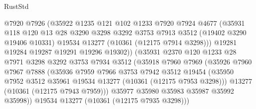 \begin{lexlean}{RustStd}
\begin{coremodule}
                        @7920
                        @7926
                        (@35922
                          @1235
                          @121
                          @102
                          @1233
                          @7920
                          @7924
                          @4677
                          (@35931
                            @118
                            @120
                            @13
                            @28
                            @3290
                            @3298
                            @3292
                            @3753
                            @7913
                            @3512
                            (@19402 @3290 @19406 @10331)
                            @19534
                            @13277
                            (@10361 (@12175 @7914 @3298)))
                          @19281
                          @19284
                          @19287
                          @19291
                          @19296
                          @19302))
                      (@35931
                        @2370
                        @120
                        @1233
                        @28
                        @7971
                        @3298
                        @3292
                        @3753
                        @7934
                        @3512
                        (@35918
                          @7960
                          @7969
                          (@35926
                            @7960
                            @7967
                            @7888
                            (@35936
                              @7959
                              @7966
                              @3753
                              @7942
                              @3512
                              @19454
                              (@35950
                                @7952
                                @3512
                                @35961
                                @19534
                                @13277
                                (@10361 (@12175 @7953 @3298)))
                              @13277
                              (@10361 (@12175 @7943 @7959)))
                            @35977
                            @35980
                            @35983
                            @35987
                            @35992
                            @35998))
                        @19534
                        @13277
                        (@10361 (@12175 @7935 @3298)))

\end{coremodule}
\end{lexlean}

